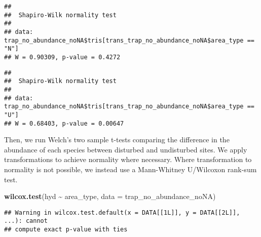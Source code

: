 \documentclass[
]{article}
\newenvironment{Shaded}{\begin{snugshade}}{\end{snugshade}}
\newcommand{\AttributeTok}[1]{\textcolor[rgb]{0.13,0.29,0.53}{#1}}
\newcommand{\FunctionTok}[1]{\textcolor[rgb]{0.13,0.29,0.53}{\textbf{#1}}}
\newcommand{\NormalTok}[1]{#1}
\newcommand{\SpecialCharTok}[1]{\textcolor[rgb]{0.81,0.36,0.00}{\textbf{#1}}}
\newcommand{\StringTok}[1]{\textcolor[rgb]{0.31,0.60,0.02}{#1}}
\begin{document}
\begin{Shaded}
\end{Shaded}

\begin{verbatim}
## 
##  Shapiro-Wilk normality test
## 
## data:  trap_no_abundance_noNA$tris[trans_trap_no_abundance_noNA$area_type == "N"]
## W = 0.90309, p-value = 0.4272
\end{verbatim}

\begin{Shaded}
\end{Shaded}

\begin{verbatim}
## 
##  Shapiro-Wilk normality test
## 
## data:  trap_no_abundance_noNA$tris[trans_trap_no_abundance_noNA$area_type == "U"]
## W = 0.68403, p-value = 0.00647
\end{verbatim}

Then, we run Welch's two sample t-tests comparing the difference in the
abundance of each species between disturbed and undisturbed sites. We
apply transformations to achieve normality where necessary. Where
transformation to normality is not possible, we instead use a
Mann-Whitney U/Wilcoxon rank-sum test.

\begin{Shaded}
\begin{Highlighting}[]
\FunctionTok{wilcox.test}\NormalTok{(hyd }\SpecialCharTok{\textasciitilde{}}\NormalTok{ area\_type, }\AttributeTok{data =}\NormalTok{ trap\_no\_abundance\_noNA)}
\end{Highlighting}
\end{Shaded}

\begin{verbatim}
## Warning in wilcox.test.default(x = DATA[[1L]], y = DATA[[2L]], ...): cannot
## compute exact p-value with ties
\end{verbatim}
\end{document}
